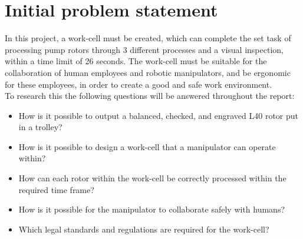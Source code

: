 
\newpage
\section{Initial problem statement}\label{ch:Initial problem statment}


In this project, a work-cell must be created, which can complete the set task of processing pump rotors through 3 different processes and a visual inspection, within a time limit of 26 seconds. The work-cell must be suitable for the collaboration of human employees and robotic manipulators, and be ergonomic for these employees, in order to create a good and safe work environment. \\
To research this the following questions will be answered throughout the report:

\begin{itemize}

    \item How is it possible to output a balanced, checked, and engraved L40 rotor put in a trolley?
    \item How is it possible to design a work-cell that a manipulator can operate within?
    \item How can each rotor within the work-cell be correctly processed within the required time frame?
    \item How is it possible for the manipulator to collaborate safely with humans?
    \item Which legal standards and regulations are required for the work-cell?
\end{itemize}

